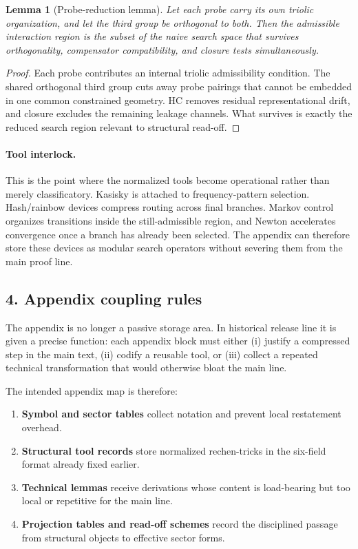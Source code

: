 \documentclass[12pt,a4paper]{article}
\DeclareRobustCommand{\QSCver}[1]{archival stage}
\newtheorem{lemma}[theorem]{Lemma}
\renewcommand{\QSCver}[1]{historical release line}
\begin{document}
\begin{lemma}[Probe-reduction lemma]
\label{lem:probe-reduction-lemma}
Let each probe carry its own triolic organization, and let the third group be
orthogonal to both. Then the admissible interaction region is the subset of the
naive search space that survives orthogonality, compensator compatibility, and
closure tests simultaneously.
\end{lemma}

\begin{proof}
Each probe contributes an internal triolic admissibility condition. The shared
orthogonal third group cuts away probe pairings that cannot be embedded in one
common constrained geometry. HC removes residual representational drift, and
closure excludes the remaining leakage channels. What survives is exactly the
reduced search region relevant to structural read-off.
\end{proof}

\paragraph{Tool interlock.}
This is the point where the normalized tools become operational rather than
merely classificatory. Kasisky is attached to frequency-pattern selection.
Hash/rainbow devices compress routing across final branches. Markov control
organizes transitions inside the still-admissible region, and Newton
accelerates convergence once a branch has already been selected. The appendix
can therefore store these devices as modular search operators without severing
them from the main proof line.

\subsection*{4. Appendix coupling rules}
The appendix is no longer a passive storage area. In \QSCver{v1.4.0} it is given a
precise function: each appendix block must either (i) justify a compressed step
in the main text, (ii) codify a reusable tool, or (iii) collect a repeated
technical transformation that would otherwise bloat the main line.

The intended appendix map is therefore:
\begin{enumerate}[leftmargin=2em]
 \item \textbf{Symbol and sector tables} collect notation and prevent local
 restatement overhead.
 \item \textbf{Structural tool records} store normalized rechen-tricks in the
 six-field format already fixed earlier.
 \item \textbf{Technical lemmas} receive derivations whose content is
 load-bearing but too local or repetitive for the main line.
 \item \textbf{Projection tables and read-off schemes} record the disciplined
 passage from structural objects to effective sector forms.
\end{enumerate}
\end{document}
